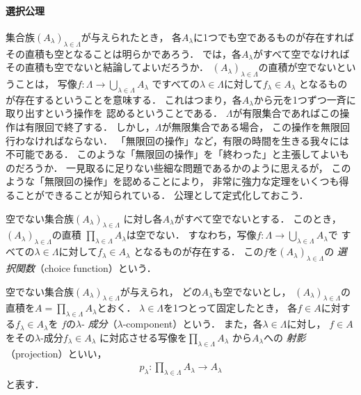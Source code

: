  \paragraph{選択公理}
  集合族$(A_{\lambda})_{\lambda \in \varLambda}$が与えられたとき，
  各$A_{\lambda}$に1つでも空であるものが存在すれば
  その直積も空となることは明らかであろう．
  では，各$A_{\lambda}$がすべて空でなければその直積も空でないと結論してよいだろうか．
  $(A_{\lambda})_{\lambda \in \varLambda}$の直積が空でないということは，
  写像$f : \varLambda \longrightarrow \bigcup_{\lambda \in \varLambda} A_{\lambda}$
  ですべての$\lambda \in \varLambda$に対して$f_{\lambda} \in A_{\lambda}$
  となるものが存在するということを意味する．
  これはつまり，各$A_{\lambda}$から元を1つずつ一斉に取り出すという操作を
  認めるということである．
  $\varLambda$が有限集合であればこの操作は有限回で終了する．
  しかし，$\varLambda$が無限集合である場合，
  この操作を無限回行わなければならない．
  「無限回の操作」など，有限の時間を生きる我々には不可能である．
  このような「無限回の操作」を「終わった」と主張してよいものだろうか．
  一見取るに足りない些細な問題であるかのように思えるが，
  このような「無限回の操作」を認めることにより，
  非常に強力な定理をいくつも得ることができることが知られている．
  公理として定式化しておこう．


  \begin{axiom}[選択公理]
    空でない集合族$(A_{\lambda})_{\lambda \in \varLambda}$
    に対し各$A_{\lambda}$がすべて空でないとする．
    このとき，$(A_{\lambda})_{\lambda \in \varLambda}$の直積
    $\prod_{\lambda \in \varLambda} A_{\lambda}$は空でない．
    すなわち，写像$f: \varLambda \longrightarrow 
    \bigcup_{\lambda \in \varLambda} A_{\lambda}$で
    すべての$\lambda \in \varLambda$に対して$f_{\lambda} \in A_{\lambda}$
    となるものが存在する．
    この$f$を$(A_{\lambda})_{\lambda \in \varLambda}$の
    \emph{選択関数}（choice function）という．
  \end{axiom}

  空でない集合族$(A_{\lambda})_{\lambda \in \varLambda}$が与えられ，
  どの$A_{\lambda}$も空でないとし，
  $(A_{\lambda})_{\lambda \in \varLambda}$の
  直積を$A= \prod_{\lambda \in \varLambda} A_{\lambda}$とおく．
  $\lambda \in \varLambda$を1つとって固定したとき，
  各$f \in A$に対する$f_{\lambda} \in A_{\lambda}$を
  $f$の$\lambda $-%
  \emph{成分}（$\lambda$-component）という．
  また，各$\lambda \in \varLambda$に対し，
  $f \in A$をその$\lambda$-成分$f_{\lambda} \in A_{\lambda}$
  に対応させる写像を$\prod_{\lambda \in \varLambda} A_{\lambda}$
  から$A_{\lambda}$への
  \emph{射影}（projection）といい，
  \begin{align}
    p_{\lambda} : \prod_{\lambda \in \varLambda} A_{\lambda} \longrightarrow A_{\lambda}
    \label{eq:projepro}
  \end{align}
  と表す．

